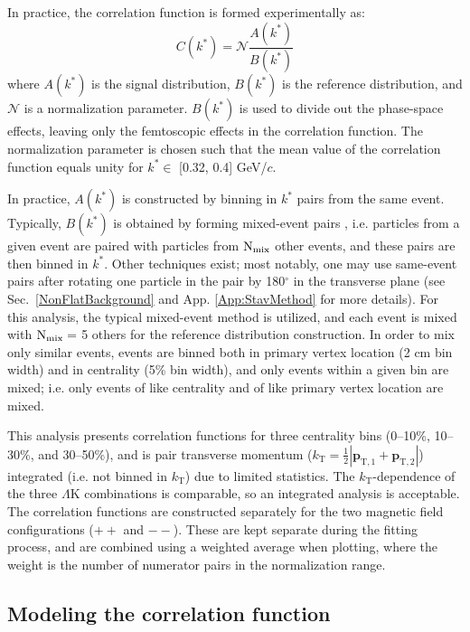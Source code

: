 \documentclass[ALICE,manyauthors]{cernphprep}
\newcommand{\kstar}{$k^{*}$\xspace}
\newcommand{\LamK}{$\Lambda$K\xspace}
\begin{document}
In practice, the correlation function is formed experimentally as:
\begin{equation}
  C(k^{*}) = \mathcal{N}\frac{A(k^{*})}{B(k^{*})}
\label{eqn:CfExp}
\end{equation}
where $A(k^{*})$ is the signal distribution, $B(k^{*})$ is the reference distribution, and $\mathcal{N}$ is a normalization parameter.  
$B(k^{*})$ is used to divide out the phase-space effects, leaving only the femtoscopic effects in the correlation function. 
The normalization parameter is chosen such that the mean value of the correlation function equals unity for \kstar $\in$ [0.32, 0.4] GeV/$c$.


In practice, $A(k^{*})$ is constructed by binning in \kstar pairs from the same event.
Typically, $B(k^{*})$ is obtained by forming mixed-event pairs \cite{Kopylov:1974th}, i.e. particles from a given event are paired with particles from $\rm N_{mix}$ other events, and these pairs are then binned in \kstar.
Other techniques exist; most notably, one may use same-event pairs after rotating one particle in the pair by 180$^\circ$ in the transverse plane (see Sec.\ \ref{NonFlatBackground} and App. \ref{App:StavMethod} for more details).
For this analysis, the typical mixed-event method is utilized, and each event is mixed with $\rm N_{mix} =$ 5 others for the reference distribution construction.
In order to mix only similar events, events are binned both in primary vertex location (2 cm bin width) and in centrality (5\% bin width), and only events within a given bin are mixed; i.e. only events of like centrality and of like primary vertex location are mixed.

This analysis presents correlation functions for three centrality bins (0--10\%, 10--30\%, and 30--50\%), and is pair transverse momentum ($k_{\mathrm{T}} = \frac{1}{2}|\mathbf{p}_{\mathrm{T,1}}+\mathbf{p}_{\mathrm{T,2}}|$) integrated (i.e. not binned in $k_{\mathrm{T}}$) due to limited statistics.
The $k_{\mathrm{T}}$-dependence of the three \LamK combinations is comparable, so an integrated analysis is acceptable.
The correlation functions are constructed separately for the two magnetic field configurations ($++$ and $--$).
These are kept separate during the fitting process, and are combined using a weighted average when plotting, where the weight is the number of numerator pairs in the normalization range.

\subsection{Modeling the correlation function}
\label{sec:ModelingCF}
\end{document}
